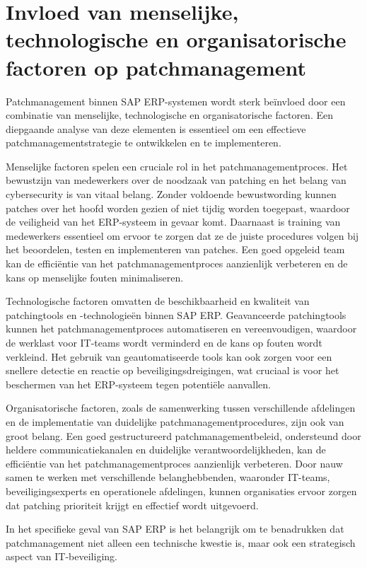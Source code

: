 \section{Invloed van menselijke, technologische en organisatorische factoren op patchmanagement}

Patchmanagement binnen SAP ERP-systemen wordt sterk beïnvloed door een combinatie van menselijke, technologische en organisatorische factoren. Een diepgaande analyse van deze elementen is essentieel om een effectieve patchmanagementstrategie te ontwikkelen en te implementeren.

Menselijke factoren spelen een cruciale rol in het patchmanagementproces. Het bewustzijn van medewerkers over de noodzaak van patching en het belang van cybersecurity is van vitaal belang. Zonder voldoende bewustwording kunnen patches over het hoofd worden gezien of niet tijdig worden toegepast, waardoor de veiligheid van het ERP-systeem in gevaar komt. Daarnaast is training van medewerkers essentieel om ervoor te zorgen dat ze de juiste procedures volgen bij het beoordelen, testen en implementeren van patches. Een goed opgeleid team kan de efficiëntie van het patchmanagementproces aanzienlijk verbeteren en de kans op menselijke fouten minimaliseren.

Technologische factoren omvatten de beschikbaarheid en kwaliteit van patchingtools en -technologieën binnen SAP ERP. Geavanceerde patchingtools kunnen het patchmanagementproces automatiseren en vereenvoudigen, waardoor de werklast voor IT-teams wordt verminderd en de kans op fouten wordt verkleind. Het gebruik van geautomatiseerde tools kan ook zorgen voor een snellere detectie en reactie op beveiligingsdreigingen, wat cruciaal is voor het beschermen van het ERP-systeem tegen potentiële aanvallen.

Organisatorische factoren, zoals de samenwerking tussen verschillende afdelingen en de implementatie van duidelijke patchmanagementprocedures, zijn ook van groot belang. Een goed gestructureerd patchmanagementbeleid, ondersteund door heldere communicatiekanalen en duidelijke verantwoordelijkheden, kan de efficiëntie van het patchmanagementproces aanzienlijk verbeteren. Door nauw samen te werken met verschillende belanghebbenden, waaronder IT-teams, beveiligingsexperts en operationele afdelingen, kunnen organisaties ervoor zorgen dat patching prioriteit krijgt en effectief wordt uitgevoerd.


In het specifieke geval van SAP ERP is het belangrijk om te benadrukken dat patchmanagement niet alleen een technische kwestie is, maar ook een strategisch aspect van IT-beveiliging.

